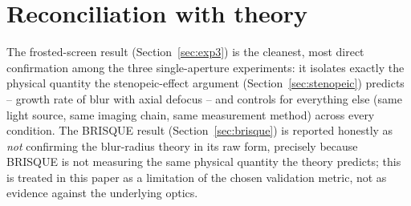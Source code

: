 
\section{Reconciliation with theory}
The frosted-screen result (Section~\ref{sec:exp3}) is the cleanest, most direct
confirmation among the three single-aperture experiments: it isolates exactly the
physical quantity the stenopeic-effect argument (Section~\ref{sec:stenopeic}) predicts
-- growth rate of blur with axial defocus -- and controls for everything else (same
light source, same imaging chain, same measurement method) across every condition. The
BRISQUE result (Section~\ref{sec:brisque}) is reported honestly as \emph{not}
confirming the blur-radius theory in its raw form, precisely because BRISQUE is not
measuring the same physical quantity the theory predicts; this is treated in this paper
as a limitation of the chosen validation metric, not as evidence against the underlying
optics.
